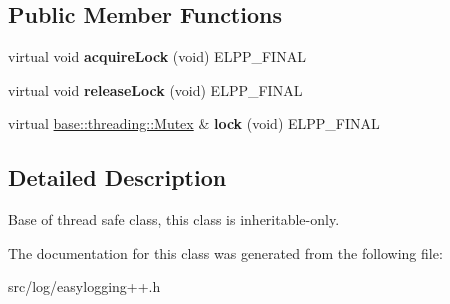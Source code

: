 \subsection*{Public Member Functions}
\begin{DoxyCompactItemize}
\item 
virtual void {\bfseries acquire\+Lock} (void) E\+L\+P\+P\+\_\+\+F\+I\+N\+AL\hypertarget{classel_1_1base_1_1threading_1_1ThreadSafe_a59db719b214f7118f0919846a85077bf}{}\label{classel_1_1base_1_1threading_1_1ThreadSafe_a59db719b214f7118f0919846a85077bf}

\item 
virtual void {\bfseries release\+Lock} (void) E\+L\+P\+P\+\_\+\+F\+I\+N\+AL\hypertarget{classel_1_1base_1_1threading_1_1ThreadSafe_a95bb166242b9691f861274a9b8ced2d9}{}\label{classel_1_1base_1_1threading_1_1ThreadSafe_a95bb166242b9691f861274a9b8ced2d9}

\item 
virtual \hyperlink{classel_1_1base_1_1threading_1_1internal_1_1NoMutex}{base\+::threading\+::\+Mutex} \& {\bfseries lock} (void) E\+L\+P\+P\+\_\+\+F\+I\+N\+AL\hypertarget{classel_1_1base_1_1threading_1_1ThreadSafe_affb45b35790a7305d0a659562c8104fc}{}\label{classel_1_1base_1_1threading_1_1ThreadSafe_affb45b35790a7305d0a659562c8104fc}

\end{DoxyCompactItemize}


\subsection{Detailed Description}
Base of thread safe class, this class is inheritable-\/only. 

The documentation for this class was generated from the following file\+:\begin{DoxyCompactItemize}
\item 
src/log/easylogging++.\+h\end{DoxyCompactItemize}
